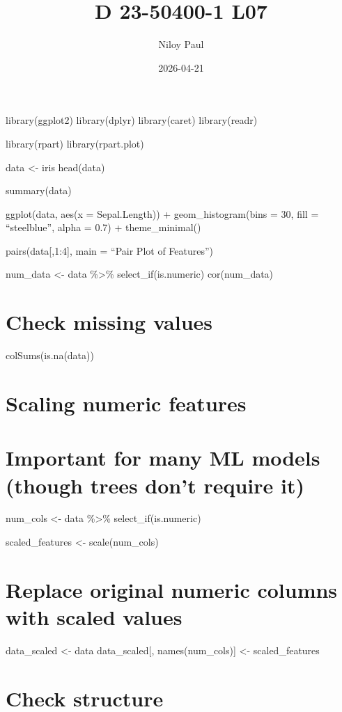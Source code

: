 \documentclass[
]{article}
\title{D 23-50400-1 L07}
\author{Niloy Paul}
\date{2026-04-21}
\begin{document}
\maketitle

library(ggplot2) library(dplyr) library(caret) library(readr)

library(rpart) library(rpart.plot)

data \textless- iris head(data)

summary(data)

ggplot(data, aes(x = Sepal.Length)) + geom\_histogram(bins = 30, fill =
``steelblue'', alpha = 0.7) + theme\_minimal()

pairs(data{[},1:4{]}, main = ``Pair Plot of Features'')

num\_data \textless- data \%\textgreater\% select\_if(is.numeric)
cor(num\_data)

\section{Check missing values}\label{check-missing-values}

colSums(is.na(data))

\section{Scaling numeric features}\label{scaling-numeric-features}

\section{Important for many ML models (though trees don't require
it)}\label{important-for-many-ml-models-though-trees-dont-require-it}

num\_cols \textless- data \%\textgreater\% select\_if(is.numeric)

scaled\_features \textless- scale(num\_cols)

\section{Replace original numeric columns with scaled
values}\label{replace-original-numeric-columns-with-scaled-values}

data\_scaled \textless- data data\_scaled{[}, names(num\_cols){]}
\textless- scaled\_features

\section{Check structure}\label{check-structure}
\end{document}
